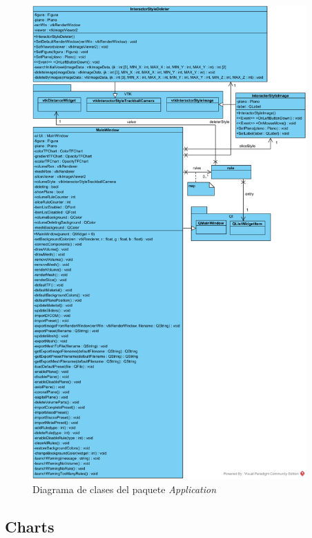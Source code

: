 \begin{figure}[H]
	\centering
	\includegraphics[width=10.5cm]{imagenes/diagramas/clases/Application}
	\caption{Diagrama de clases del paquete \textit{Application}}
	\label{fig:diagrama_clases_application}
\end{figure}

\subsection{Charts}

